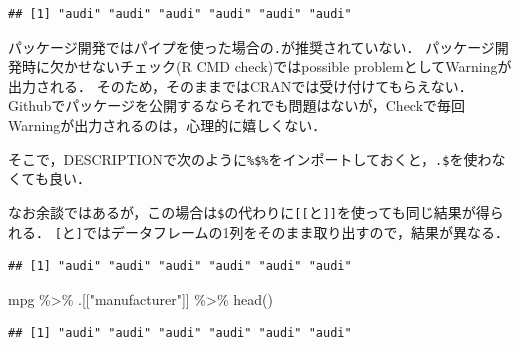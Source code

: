 \documentclass[
]{article}
\newenvironment{Shaded}{\begin{snugshade}}{\end{snugshade}}
\newcommand{\FunctionTok}[1]{\textcolor[rgb]{0.00,0.00,0.00}{#1}}
\newcommand{\NormalTok}[1]{#1}
\newcommand{\SpecialCharTok}[1]{\textcolor[rgb]{0.00,0.00,0.00}{#1}}
\newcommand{\StringTok}[1]{\textcolor[rgb]{0.31,0.60,0.02}{#1}}
\begin{document}
\begin{verbatim}
## [1] "audi" "audi" "audi" "audi" "audi" "audi"
\end{verbatim}

パッケージ開発ではパイプを使った場合の\texttt{.}が推奨されていない．
パッケージ開発時に欠かせないチェック(R CMD check)ではpossible problemとしてWarningが出力される．
そのため，そのままではCRANでは受け付けてもらえない．
Githubでパッケージを公開するならそれでも問題はないが，Checkで毎回Warningが出力されるのは，心理的に嬉しくない．

そこで，DESCRIPTIONで次のように\texttt{\%\$\%}をインポートしておくと，\texttt{.\$}を使わなくても良い．

\begin{Shaded}
\end{Shaded}

なお余談ではあるが，この場合は\texttt{\$}の代わりに\texttt{{[}{[}}と\texttt{{]}{]}}を使っても同じ結果が得られる．
\texttt{{[}}と\texttt{{]}}ではデータフレームの1列をそのまま取り出すので，結果が異なる．

\begin{Shaded}
\end{Shaded}

\begin{verbatim}
## [1] "audi" "audi" "audi" "audi" "audi" "audi"
\end{verbatim}

\begin{Shaded}
\begin{Highlighting}[]
\NormalTok{mpg }\SpecialCharTok{\%\textgreater{}\%}\NormalTok{ .[[}\StringTok{"manufacturer"}\NormalTok{]] }\SpecialCharTok{\%\textgreater{}\%} \FunctionTok{head}\NormalTok{()}
\end{Highlighting}
\end{Shaded}

\begin{verbatim}
## [1] "audi" "audi" "audi" "audi" "audi" "audi"
\end{verbatim}
\end{document}
